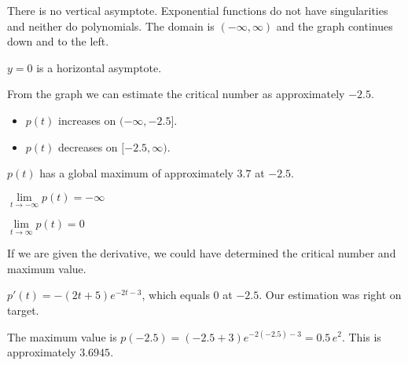 \documentclass{ximera}
\begin{document}
\begin{example}
\begin{explanation}
\begin{image}
\end{image}




There is no vertical asymptote. Exponential functions do not have singularities and neither do polynomials.  The domain is $(-\infty, \infty)$ and the graph continues down and to the left.

$y = 0$ is a horizontal asymptote.

From the graph we can estimate the critical number as approximately $-2.5$.





\begin{itemize}
\item $p(t)$ increases on $(-\infty, -2.5]$.
\item $p(t)$ decreases on $[-2.5, \infty)$.
\end{itemize}


$p(t)$ has a global maximum of approximately $3.7$ at $-2.5$.


$\lim\limits_{t \to -\infty} p(t) = -\infty$


$\lim\limits_{t \to \infty} p(t) = 0$




\end{explanation}

\end{example}

If we are given the derivative, we could have determined the critical number and maximum value.


$p'(t) = -(2t+5) e^{-2t-3}$, which equals $0$ at $-2.5$.  Our estimation was right on target.  

The maximum value is $p(-2.5) = (-2.5+3)e^{-2(-2.5)-3} = 0.5 \, e^{2}$.  This is approximately $3.6945$.
\end{document}
